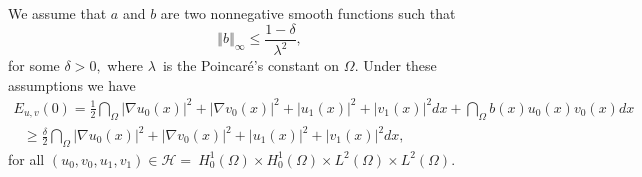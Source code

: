 \documentclass[11pt,reqno]{amsart}
\theoremstyle{plain}
\numberwithin{equation}{section}
\numberwithin{equation}{section}
\begin{document}
We assume that $a$ and $b$ are two nonnegative smooth functions such that 
\begin{equation}
\left\Vert b\right\Vert _{\infty }\leq \frac{1-\delta }{\lambda ^{2}},
\label{b condition}
\end{equation}%
for some $\delta >0,$ where $\lambda $\ is the Poincar\'{e}'s constant on $%
\Omega .$ Under these assumptions we have%
\begin{equation}
\begin{array}{l}
E_{u,v}\left( 0\right) =\frac{1}{2}\dint_{\Omega }\left\vert \nabla
u_{0}\left( x\right) \right\vert ^{2}+\left\vert \nabla v_{0}\left( x\right)
\right\vert ^{2}+\left\vert u_{1}\left( x\right) \right\vert ^{2}+\left\vert
v_{1}\left( x\right) \right\vert ^{2}dx+\dint_{\Omega }b\left( x\right)
u_{0}\left( x\right) v_{0}\left( x\right) dx \\ 
\text{ \ \ \ \ \ \ \ \ \ \ }\geq \frac{\delta }{2}\dint_{\Omega }\left\vert
\nabla u_{0}\left( x\right) \right\vert ^{2}+\left\vert \nabla v_{0}\left(
x\right) \right\vert ^{2}+\left\vert u_{1}\left( x\right) \right\vert
^{2}+\left\vert v_{1}\left( x\right) \right\vert ^{2}dx,%
\end{array}
\label{b assumption intro}
\end{equation}%
for all $\left( u_{0},v_{0},u_{1},v_{1}\right) \in \mathcal{H}%
=~H_{0}^{1}\left( \Omega \right) \times H_{0}^{1}\left( \Omega \right)
\times L^{2}\left( \Omega \right) \times L^{2}\left( \Omega \right) .$
\end{document}
